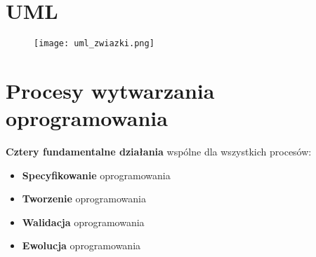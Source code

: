 \documentclass[a4paper]{article}
\begin{document}
    \section {UML}
    \begin{figure}[H]
        \texttt{[image: uml\_zwiazki.png]}
    \end{figure}


    \section{Procesy wytwarzania oprogramowania}
    \textbf{Cztery fundamentalne działania }wspólne dla wszystkich procesów:
    \begin{itemize}
        \item \textbf{Specyfikowanie} oprogramowania
        \item \textbf{Tworzenie} oprogramowania
        \item \textbf{Walidacja} oprogramowania
        \item \textbf{Ewolucja} oprogramowania
    \end{itemize}
\end{document}
